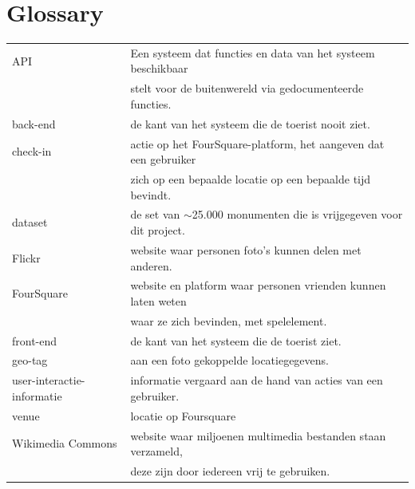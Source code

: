\documentclass[a4paper,10pt]{article}
\begin{document}
	\clearpage
	\section{Glossary}
		\begin{tabular}{ l | l }
		API & Een systeem dat functies en data van het systeem beschikbaar  \\
			& stelt voor de buitenwereld via gedocumenteerde functies.\\
		back-end & de kant van het systeem die de toerist nooit ziet.\\
		check-in& actie op het FourSquare-platform, het aangeven dat een gebruiker  \\
			& zich op een bepaalde locatie op een bepaalde tijd bevindt.\\
		dataset & de set van $\sim$25.000 monumenten die is vrijgegeven voor dit project.\\
		Flickr & website waar personen foto's kunnen delen met anderen.\\
		FourSquare& website en platform waar personen vrienden kunnen laten weten \\
			& waar ze zich bevinden, met spelelement.\\
		front-end & de kant van het systeem die de toerist ziet.\\
		geo-tag & aan een foto gekoppelde locatiegegevens.\\
		user-interactie-informatie& informatie vergaard aan de hand van acties van een gebruiker.\\
		venue & locatie op Foursquare\\
		Wikimedia Commons& website waar miljoenen multimedia bestanden staan verzameld, \\
			& deze zijn door iedereen vrij te gebruiken.\\
		\end{tabular}
\end{document}
